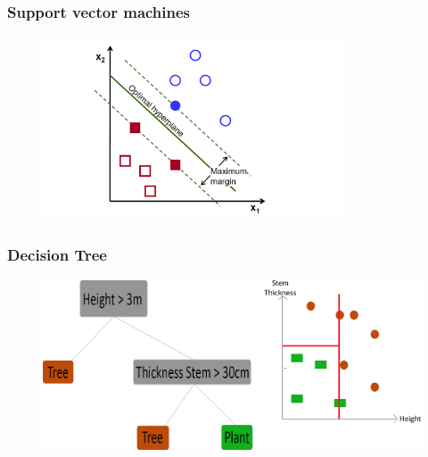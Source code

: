 \documentclass{beamer}
\begin{document}

\begin{frame}
\frametitle{Support vector machines}
\begin{figure}
	\centering
    \includegraphics[width=90mm,scale=1]{./img/SVM.png}
\end{figure}

\end{frame}


\begin{frame} %
\frametitle{Decision Tree}
\begin{figure}
	\centering
    \includegraphics[width=\textwidth,scale=1]{./img/DTExplained.png}
\end{figure}

\end{frame}
\end{document}
